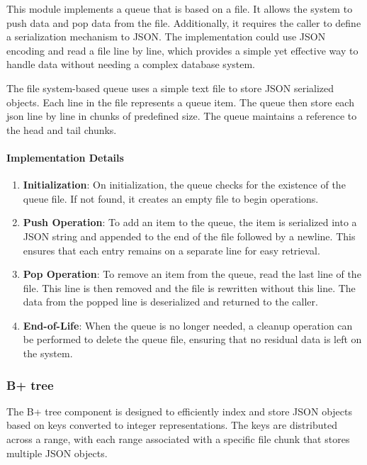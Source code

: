 This module implements a queue that is based on a file. It allows the system to push data and pop data from the file. Additionally, it requires the caller to define a serialization mechanism to JSON. The implementation could use JSON encoding and read a file line by line, which provides a simple yet effective way to handle data without needing a complex database system.

The file system-based queue uses a simple text file to store JSON serialized objects. Each line in the file represents a queue item. The queue then store each json line by line in chunks of predefined size. The queue maintains a reference to the head and tail chunks.

\paragraph{Implementation Details}
\begin{enumerate}
    \item \textbf{Initialization}: On initialization, the queue checks for the existence of the queue file. If not found, it creates an empty file to begin operations.
    \item \textbf{Push Operation}: To add an item to the queue, the item is serialized into a JSON string and appended to the end of the file followed by a newline. This ensures that each entry remains on a separate line for easy retrieval.
    \item \textbf{Pop Operation}: To remove an item from the queue, read the last line of the file. This line is then removed and the file is rewritten without this line. The data from the popped line is deserialized and returned to the caller.
    \item \textbf{End-of-Life}: When the queue is no longer needed, a cleanup operation can be performed to delete the queue file, ensuring that no residual data is left on the system.
\end{enumerate}

\pagebreak

\subsubsection{B+ tree}

The B+ tree component is designed to efficiently index and store JSON objects based on keys converted to integer representations. The keys are distributed across a range, with each range associated with a specific file chunk that stores multiple JSON objects.

